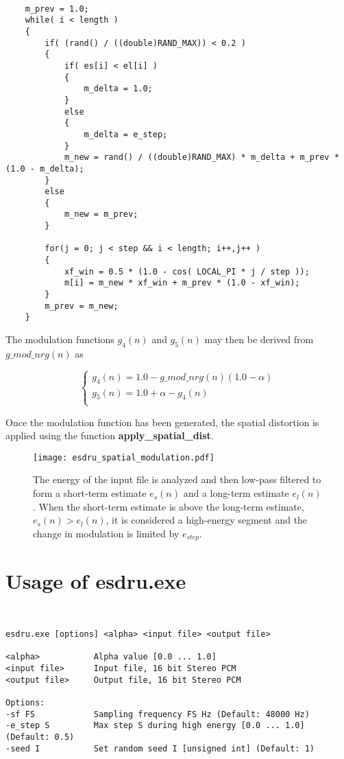 {\tt\small
\begin{verbatim}
    m_prev = 1.0;
    while( i < length )    
    {
        if( (rand() / ((double)RAND_MAX)) < 0.2 )
        { 
            if( es[i] < el[i] )
            {
                m_delta = 1.0;
            }
            else
            {
                m_delta = e_step;
            }
            m_new = rand() / ((double)RAND_MAX) * m_delta + m_prev * (1.0 - m_delta);
        }
        else
        {
            m_new = m_prev;
        }

        for(j = 0; j < step && i < length; i++,j++ )
        {
            xf_win = 0.5 * (1.0 - cos( LOCAL_PI * j / step ));
            m[i] = m_new * xf_win + m_prev * (1.0 - xf_win);
        }
        m_prev = m_new;
    }
\end{verbatim}
}    
    
The modulation functions $g_4(n)$ and $g_5(n)$ may then be derived from $g\_mod\_nrg(n)$ as 

  \[
    \left\{
       \begin{array}{ll}
            g_4(n) = 1.0 - g\_mod\_nrg(n) (1.0 - \alpha) \\
            g_5(n) = 1.0 + \alpha - g_4(n)               \\
       \end{array}
     \right.
  \]
  
Once the modulation function has been generated, the spatial distortion is applied using the 
function \textbf{apply\_spatial\_dist}.


\begin{figure}[htp]
    \begin{center}
        \texttt{[image: esdru\_spatial\_modulation.pdf]}
  \end{center}
  \caption{The energy of the input file is analyzed and then low-pass filtered to form a 
           short-term estimate $e_s(n)$ and a long-term estimate $e_l(n)$. When the short-term  
           estimate is above the long-term estimate, $e_s(n)>e_l(n)$, it is considered a high-energy
           segment and the change in modulation is limited by $e_{step}$.
           \label{fig:esdru_spatial_modulation} }
\end{figure}



\section{Usage of esdru.exe}

{\tt\small
\begin{verbatim}
esdru.exe [options] <alpha> <input file> <output file>

<alpha>           Alpha value [0.0 ... 1.0]
<input file>      Input file, 16 bit Stereo PCM
<output file>     Output file, 16 bit Stereo PCM

Options:
-sf FS            Sampling frequency FS Hz (Default: 48000 Hz)
-e_step S         Max step S during high energy [0.0 ... 1.0] (Default: 0.5)
-seed I           Set random seed I [unsigned int] (Default: 1)
\end{verbatim}
}